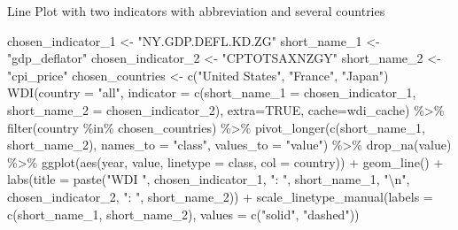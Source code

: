 \documentclass[
]{bxjsbook}
\newenvironment{Shaded}{\begin{snugshade}}{\end{snugshade}}
\newcommand{\AttributeTok}[1]{\textcolor[rgb]{0.77,0.63,0.00}{#1}}
\newcommand{\ConstantTok}[1]{\textcolor[rgb]{0.00,0.00,0.00}{#1}}
\newcommand{\FunctionTok}[1]{\textcolor[rgb]{0.00,0.00,0.00}{#1}}
\newcommand{\NormalTok}[1]{#1}
\newcommand{\OtherTok}[1]{\textcolor[rgb]{0.56,0.35,0.01}{#1}}
\newcommand{\SpecialCharTok}[1]{\textcolor[rgb]{0.00,0.00,0.00}{#1}}
\newcommand{\StringTok}[1]{\textcolor[rgb]{0.31,0.60,0.02}{#1}}
\theoremstyle{definition}
\theoremstyle{definition}
\theoremstyle{definition}
\theoremstyle{definition}
\theoremstyle{remark}
\begin{document}
Line Plot with two indicators with abbreviation and several countries

\begin{Shaded}
\begin{Highlighting}[]
\NormalTok{chosen\_indicator\_1 }\OtherTok{\textless{}{-}} \StringTok{"NY.GDP.DEFL.KD.ZG"}
\NormalTok{short\_name\_1 }\OtherTok{\textless{}{-}} \StringTok{"gdp\_deflator"}
\NormalTok{chosen\_indicator\_2 }\OtherTok{\textless{}{-}} \StringTok{"CPTOTSAXNZGY"}
\NormalTok{short\_name\_2 }\OtherTok{\textless{}{-}} \StringTok{"cpi\_price"}
\NormalTok{chosen\_countries }\OtherTok{\textless{}{-}} \FunctionTok{c}\NormalTok{(}\StringTok{"United States"}\NormalTok{, }\StringTok{"France"}\NormalTok{, }\StringTok{"Japan"}\NormalTok{)}
\FunctionTok{WDI}\NormalTok{(}\AttributeTok{country =} \StringTok{"all"}\NormalTok{, }\AttributeTok{indicator =} \FunctionTok{c}\NormalTok{(}\AttributeTok{short\_name\_1 =}\NormalTok{ chosen\_indicator\_1, }\AttributeTok{short\_name\_2 =}\NormalTok{ chosen\_indicator\_2), }\AttributeTok{extra=}\ConstantTok{TRUE}\NormalTok{, }\AttributeTok{cache=}\NormalTok{wdi\_cache) }\SpecialCharTok{\%\textgreater{}\%} 
  \FunctionTok{filter}\NormalTok{(country }\SpecialCharTok{\%in\%}\NormalTok{ chosen\_countries) }\SpecialCharTok{\%\textgreater{}\%} 
  \FunctionTok{pivot\_longer}\NormalTok{(}\FunctionTok{c}\NormalTok{(short\_name\_1, short\_name\_2), }\AttributeTok{names\_to =} \StringTok{"class"}\NormalTok{, }\AttributeTok{values\_to =} \StringTok{"value"}\NormalTok{) }\SpecialCharTok{\%\textgreater{}\%} \FunctionTok{drop\_na}\NormalTok{(value) }\SpecialCharTok{\%\textgreater{}\%}
  \FunctionTok{ggplot}\NormalTok{(}\FunctionTok{aes}\NormalTok{(year, value, }\AttributeTok{linetype =}\NormalTok{ class, }\AttributeTok{col =}\NormalTok{ country)) }\SpecialCharTok{+} \FunctionTok{geom\_line}\NormalTok{() }\SpecialCharTok{+}
  \FunctionTok{labs}\NormalTok{(}\AttributeTok{title =} \FunctionTok{paste}\NormalTok{(}\StringTok{"WDI "}\NormalTok{, chosen\_indicator\_1, }\StringTok{": "}\NormalTok{, short\_name\_1, }\StringTok{"}\SpecialCharTok{\textbackslash{}n}\StringTok{"}\NormalTok{, chosen\_indicator\_2, }\StringTok{": "}\NormalTok{, short\_name\_2)) }\SpecialCharTok{+}
  \FunctionTok{scale\_linetype\_manual}\NormalTok{(}\AttributeTok{labels =} \FunctionTok{c}\NormalTok{(short\_name\_1, short\_name\_2), }\AttributeTok{values =} \FunctionTok{c}\NormalTok{(}\StringTok{"solid"}\NormalTok{, }\StringTok{"dashed"}\NormalTok{))}
\end{Highlighting}
\end{Shaded}
\end{document}
